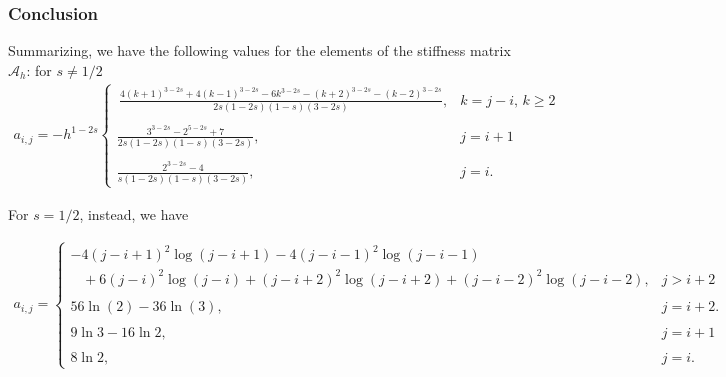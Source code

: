 \subsubsection*{Conclusion}
Summarizing, we have the following values for the elements of the stiffness matrix $\mathcal{A}_h$: for $s\neq 1/2$
\begin{align*}
	a_{i,j} =  -h^{1-2s} \begin{cases}
			\displaystyle \,\frac{4(k+1)^{3-2s} + 4(k-1)^{3-2s}-6k^{3-2s}-(k+2)^{3-2s}-(k-2)^{3-2s}}{2s(1-2s)(1-s)(3-2s)}, &  \displaystyle k=j-i,\,k\geq 2
			\\
			\\
			\displaystyle\frac{3^{3-2s}-2^{5-2s}+7}{2s(1-2s)(1-s)(3-2s)}, & \displaystyle j=i+1
			\\
			\\
			\displaystyle\frac{2^{3-2s}-4}{s(1-2s)(1-s)(3-2s)}, & \displaystyle j=i.
		\end{cases}	
\end{align*}

For $s=1/2$, instead, we have

\begin{align*}
	a_{i,j} = \begin{cases}
			-4(j-i+1)^2\log(j-i+1)-4(j-i-1)^2\log(j-i-1) 
			\\
			\;\;\;+6(j-i)^2\log(j-i)+(j-i+2)^2\log(j-i+2)+(j-i-2)^2\log(j-i-2), &  \displaystyle j> i+2
			\\
			\\
			56\ln(2)-36\ln(3), & \displaystyle j= i+2.
			\\
			\\
			\displaystyle 9\ln 3-16\ln 2, & \displaystyle j=i+1
			\\
			\\
			\displaystyle 8\ln 2, & \displaystyle j=i.
		\end{cases}	
\end{align*}

